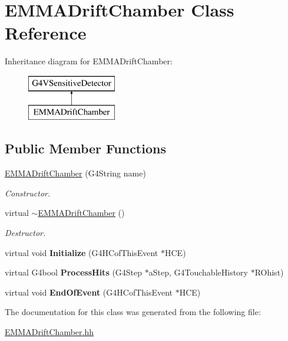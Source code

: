 \hypertarget{classEMMADriftChamber}{\section{E\-M\-M\-A\-Drift\-Chamber Class Reference}
\label{classEMMADriftChamber}
}
Inheritance diagram for E\-M\-M\-A\-Drift\-Chamber\-:\begin{figure}[H]
\begin{center}
\leavevmode
\includegraphics[height=2.000000cm]{classEMMADriftChamber}
\end{center}
\end{figure}
\subsection*{Public Member Functions}
\begin{DoxyCompactItemize}
\item 
\hypertarget{classEMMADriftChamber_a4d69a3bb5952d7a2f9b88cfe4164997d}{\hyperlink{classEMMADriftChamber_a4d69a3bb5952d7a2f9b88cfe4164997d}{E\-M\-M\-A\-Drift\-Chamber} (G4\-String name)}\label{classEMMADriftChamber_a4d69a3bb5952d7a2f9b88cfe4164997d}

\begin{DoxyCompactList}\small\item\em Constructor. \end{DoxyCompactList}\item 
\hypertarget{classEMMADriftChamber_a9d5f86484023f4a6bb7ec477e0ea8480}{virtual \hyperlink{classEMMADriftChamber_a9d5f86484023f4a6bb7ec477e0ea8480}{$\sim$\-E\-M\-M\-A\-Drift\-Chamber} ()}\label{classEMMADriftChamber_a9d5f86484023f4a6bb7ec477e0ea8480}

\begin{DoxyCompactList}\small\item\em Destructor. \end{DoxyCompactList}\item 
\hypertarget{classEMMADriftChamber_a1df534c35895643a98be25a50d2d7adc}{virtual void {\bfseries Initialize} (G4\-H\-Cof\-This\-Event $\ast$H\-C\-E)}\label{classEMMADriftChamber_a1df534c35895643a98be25a50d2d7adc}

\item 
\hypertarget{classEMMADriftChamber_aff4a2e7c1dbd6af264770cd6d96d8687}{virtual G4bool {\bfseries Process\-Hits} (G4\-Step $\ast$a\-Step, G4\-Touchable\-History $\ast$R\-Ohist)}\label{classEMMADriftChamber_aff4a2e7c1dbd6af264770cd6d96d8687}

\item 
\hypertarget{classEMMADriftChamber_a5a24e26c1a375cc97dcfcaa102adb7d4}{virtual void {\bfseries End\-Of\-Event} (G4\-H\-Cof\-This\-Event $\ast$H\-C\-E)}\label{classEMMADriftChamber_a5a24e26c1a375cc97dcfcaa102adb7d4}

\end{DoxyCompactItemize}


The documentation for this class was generated from the following file\-:\begin{DoxyCompactItemize}
\item 
\hyperlink{EMMADriftChamber_8hh}{E\-M\-M\-A\-Drift\-Chamber.\-hh}\end{DoxyCompactItemize}
